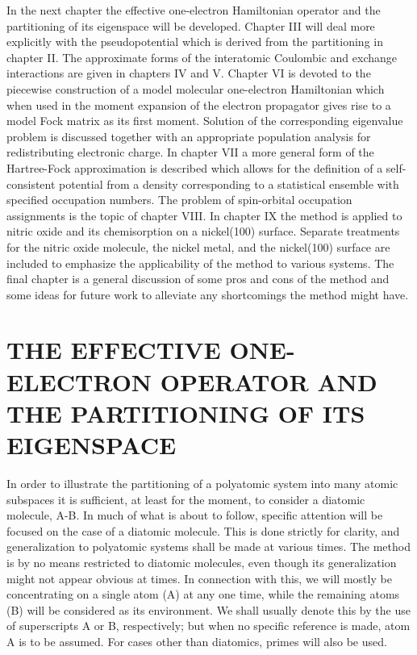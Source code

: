 \documentclass[12pt,letterpaper]{report}
\begin{document}
In the next chapter the effective one-electron Hamiltonian operator and the partitioning of its eigenspace will be developed. Chapter III will deal more explicitly with the pseudopotential which is derived from the partitioning in chapter II. The approximate forms of the interatomic Coulombic and exchange interactions are given in chapters IV and V. Chapter VI is devoted to the piecewise construction of a model molecular one-electron Hamiltonian which when used in the moment expansion of the electron propagator gives rise to a model Fock matrix as its first moment. Solution of the corresponding eigenvalue problem is discussed together with an appropriate population analysis for redistributing electronic charge. In chapter VII a more general form of the Hartree-Fock approximation is described which allows for the definition of a self-consistent potential from a density corresponding to a statistical ensemble with specified occupation numbers. The problem of spin-orbital occupation assignments is the topic of chapter VIII. In chapter IX the method is applied to nitric oxide and its chemisorption on a nickel(100) surface. Separate treatments for the nitric oxide molecule, the nickel metal, and the nickel(100) surface are included to emphasize the applicability of the method to various systems. The final chapter is a general discussion of some pros and cons of the method and some ideas for future work to alleviate any shortcomings the method might have.

\chapter{THE EFFECTIVE ONE-ELECTRON OPERATOR AND THE PARTITIONING OF ITS EIGENSPACE}

In order to illustrate the partitioning of a polyatomic system into many atomic subspaces it is sufficient, at least for the moment, to consider a diatomic molecule, A-B. In much of what is about to follow, specific attention will be focused on the case of a diatomic molecule. This is done strictly for clarity, and generalization to polyatomic systems shall be made at various times. The method is by no means restricted to diatomic molecules, even though its generalization might not appear obvious at times. In connection with this, we will mostly be concentrating on a single atom (A) at any one time, while the remaining atoms (B) will be considered as its environment. We shall usually denote this by the use of superscripts A or B, respectively; but when no specific reference is made, atom A is to be assumed. For cases other than diatomics, primes will also be used.
\end{document}
